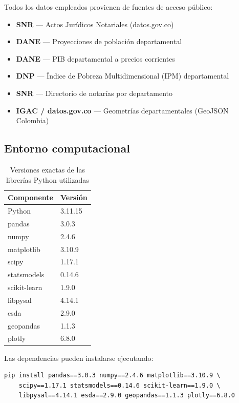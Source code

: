 \documentclass{article}
\begin{document}
Todos los datos empleados provienen de fuentes de acceso público:

\begin{itemize}
    \item \textbf{SNR} — Actos Jurídicos Notariales (datos.gov.co)
    \item \textbf{DANE} — Proyecciones de población departamental
    \item \textbf{DANE} — PIB departamental a precios corrientes
    \item \textbf{DNP} — Índice de Pobreza Multidimensional (IPM)
    departamental
    \item \textbf{SNR} — Directorio de notarías por departamento
    \item \textbf{IGAC / datos.gov.co} — Geometrías departamentales
    (GeoJSON Colombia)
\end{itemize}

\subsection{Entorno computacional}

\begin{table}[H]
\centering
\begin{tabular}{ll}
\toprule
\textbf{Componente} & \textbf{Versión} \\
\midrule
Python          & 3.11.15 \\
pandas          & 3.0.3 \\
numpy           & 2.4.6 \\
matplotlib      & 3.10.9 \\
scipy           & 1.17.1 \\
statsmodels     & 0.14.6 \\
scikit-learn    & 1.9.0 \\
libpysal        & 4.14.1 \\
esda            & 2.9.0 \\
geopandas       & 1.1.3 \\
plotly          & 6.8.0 \\
\bottomrule
\end{tabular}
\caption{Versiones exactas de las librerías Python utilizadas}
\label{tab:versiones}
\end{table}

Las dependencias pueden instalarse ejecutando:

\begin{verbatim}
pip install pandas==3.0.3 numpy==2.4.6 matplotlib==3.10.9 \
    scipy==1.17.1 statsmodels==0.14.6 scikit-learn==1.9.0 \
    libpysal==4.14.1 esda==2.9.0 geopandas==1.1.3 plotly==6.8.0
\end{verbatim}
\end{document}
